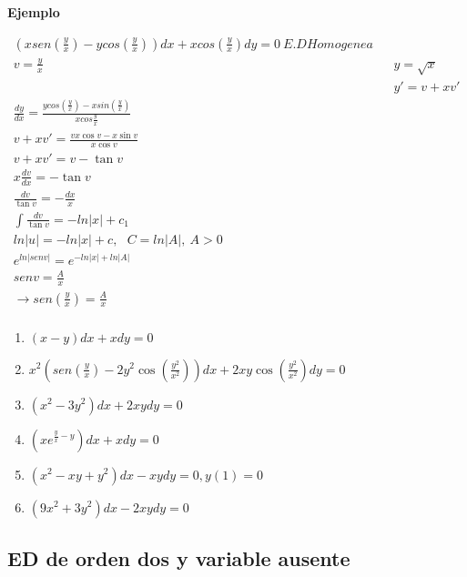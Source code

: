 \documentclass{article}
\begin{document}
\textbf{Ejemplo}

\begin{eqnarray}
\nonumber \left( xsen \left(\frac{y}{x} \right) - y cos \left(\frac{y}{x} \right) \right)dx + x cos \left( \frac{y}{x} \right) dy = 0 \  E.D Homogenea \\
\nonumber v = \frac{y}{x} &		& y = \sqrt{x} \\
\nonumber &	& y'= v + xv'\\
\nonumber \frac{dy}{dx} = \frac{y cos \left( \frac{y}{x} \right) - x sin \left(\frac{y}{x}\right)}{x cos \frac{y}{x}} \\
\nonumber v + xv' = \frac{vx \cos v - x \sin v}{x \cos v} \\
\nonumber v + xv' = v - \tan v \\
\nonumber x \frac{dv}{dx} =  - \tan v \\
\nonumber \frac{dv}{\tan v} = - \frac{dx}{x} \\
\nonumber \int \frac{dv}{\tan v} = -ln |x| + c_1 \\
\nonumber ln |u| = -ln |x| + c , \ \ \ C = ln|A|, \  A>0 \\
\nonumber e^{ln| sen v | } = e^{-ln|x| + ln |A|} \\
\nonumber sen v = \frac{A}{x} \\
\nonumber \rightarrow sen \left( \frac{y}{x} \right) = \frac{A}{x} \\
\end{eqnarray}

\begin{enumerate}
\item $\left( x -y \right)dx  + xdy = 0 $
\item $x^2 \left( sen \left( \frac{y}{x} \right) -2y^2 \cos \left( \frac{y^2}{x^2} \right) \right) dx + 2xy \cos \left( \frac{y^2}{x^2} \right) dy = 0 $ 
\item $ \left(  x^2 -3y^2 \right) dx + 2 xy dy = 0 $
\item $ \left( xe^{\frac{y}{x} - y} \right)dx + xdy = 0 $
\item $ \left( x^2 -xy + y^2 \right) dx  - xy dy = 0,  y(1) = 0  $
\item $ \left( 9x^2 + 3y^2 \right)dx - 2xy dy = 0 $ 
\end{enumerate}

\subsection{ED de orden dos y variable ausente}
\end{document}
